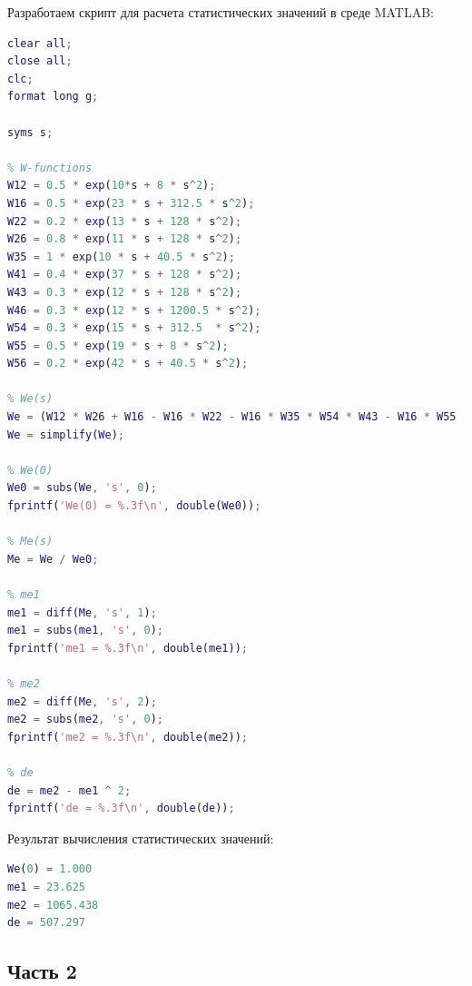 \documentclass[14pt,a4paper,report]{report}
\begin{document}
Разработаем скрипт для расчета статистических значений в среде MATLAB:
\begin{lstlisting}[language={matlab}, caption={Matlab скрипт}, basicstyle=\ttfamily]
clear all;
close all; 
clc;
format long g;

syms s;

% W-functions
W12 = 0.5 * exp(10*s + 8 * s^2);
W16 = 0.5 * exp(23 * s + 312.5 * s^2);
W22 = 0.2 * exp(13 * s + 128 * s^2);
W26 = 0.8 * exp(11 * s + 128 * s^2);
W35 = 1 * exp(10 * s + 40.5 * s^2);
W41 = 0.4 * exp(37 * s + 128 * s^2);
W43 = 0.3 * exp(12 * s + 128 * s^2);
W46 = 0.3 * exp(12 * s + 1200.5 * s^2);
W54 = 0.3 * exp(15 * s + 312.5  * s^2);
W55 = 0.5 * exp(19 * s + 8 * s^2);
W56 = 0.2 * exp(42 * s + 40.5 * s^2);

% We(s)
We = (W12 * W26 + W16 - W16 * W22 - W16 * W35 * W54 * W43 - W16 * W55 - W12 * W26 * W55 - W12 * W26 * W35 * W54 * W43 + W16 * W22 * W35 * W54 * W43 + W16 * W22 * W55) / (1 - W35 * W54 * W43 - W22 - W55 + W22 * W55 + W22 * W35 * W54 * W43);
We = simplify(We);

% We(0)
We0 = subs(We, 's', 0);
fprintf('We(0) = %.3f\n', double(We0));

% Me(s)
Me = We / We0;

% me1
me1 = diff(Me, 's', 1);
me1 = subs(me1, 's', 0);
fprintf('me1 = %.3f\n', double(me1));

% me2
me2 = diff(Me, 's', 2);
me2 = subs(me2, 's', 0);
fprintf('me2 = %.3f\n', double(me2));

% de
de = me2 - me1 ^ 2;
fprintf('de = %.3f\n', double(de));

\end{lstlisting}


Результат вычисления статистических значений:


\begin{lstlisting}[language={matlab}, caption={Matlab скрипт}, basicstyle=\ttfamily]
We(0) = 1.000
me1 = 23.625
me2 = 1065.438
de = 507.297
\end{lstlisting}


\subsection{Часть 2}
\end{document}
